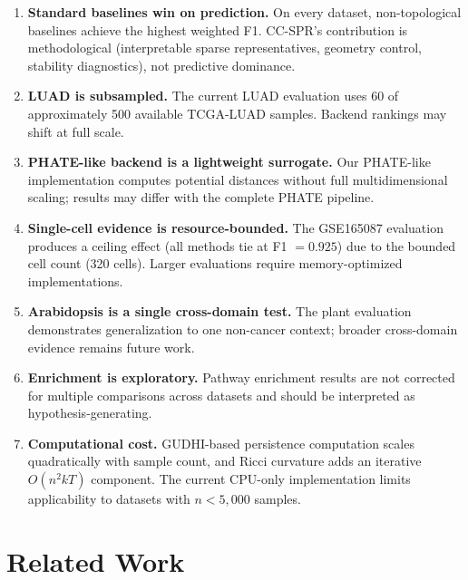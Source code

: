 \documentclass[11pt]{article}
\begin{document}
\begin{enumerate}[leftmargin=1.5em]
\item \textbf{Standard baselines win on prediction.}
On every dataset, non-topological baselines achieve the highest weighted F1.
CC-SPR's contribution is methodological (interpretable sparse representatives, geometry control, stability diagnostics), not predictive dominance.

\item \textbf{LUAD is subsampled.}
The current LUAD evaluation uses 60 of approximately 500 available TCGA-LUAD samples.
Backend rankings may shift at full scale.

\item \textbf{PHATE-like backend is a lightweight surrogate.}
Our PHATE-like implementation computes potential distances without full multidimensional scaling; results may differ with the complete PHATE pipeline.

\item \textbf{Single-cell evidence is resource-bounded.}
The GSE165087 evaluation produces a ceiling effect (all methods tie at F1 $= 0.925$) due to the bounded cell count (320 cells).
Larger evaluations require memory-optimized implementations.

\item \textbf{Arabidopsis is a single cross-domain test.}
The plant evaluation demonstrates generalization to one non-cancer context; broader cross-domain evidence remains future work.

\item \textbf{Enrichment is exploratory.}
Pathway enrichment results are not corrected for multiple comparisons across datasets and should be interpreted as hypothesis-generating.

\item \textbf{Computational cost.}
GUDHI-based persistence computation scales quadratically with sample count, and Ricci curvature adds an iterative $O(n^2 k T)$ component.
The current CPU-only implementation limits applicability to datasets with $n < 5{,}000$ samples.
\end{enumerate}

\section{Related Work}
\label{sec:related}
\end{document}
